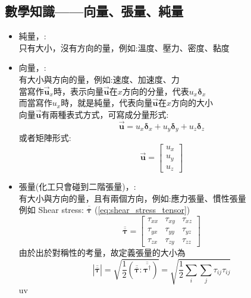 \documentclass[../main.tex]{subfiles}
\begin{document}
\subsection{數學知識——向量、張量、純量}
\begin{itemize}
  \item 純量，:\\
  只有大小，沒有方向的量，例如:溫度、壓力、密度、黏度
  \item 向量，:\\
  有大小與方向的量，例如:速度、加速度、力\\
  當寫作$\vec {\bm u}_x$時，表示向量$\vec {\bm u}$在$x$方向的分量，代表$u_x \bm \delta_x$\\
  而當寫作$u_x$時，就是純量，代表向量$\vec {\bm u}$在$x$方向的大小\\
  向量$\vec {\bm u}$有兩種表式方式，可寫成分量形式:
  \begin{equation}
    \vec {\bm u} = u_x \bm \delta_x + u_y \bm \delta_y + u_z \bm \delta_z
  \end{equation}
  或者矩陣形式:
  \begin{equation}
    \vec {\bm u} = \begin{bmatrix}
      u_x \\
      u_y \\
      u_z 
    \end{bmatrix}
  \end{equation}
  \item 張量(化工只會碰到二階張量)，:\\
  有大小與方向的量，且有兩個方向，例如:應力張量、慣性張量\\
  例如 Shear stress: $\overline{\overline{\bm \tau}}$ (\ref{eq:shear_stress_tensor})
  \begin{equation}
    \overline{\overline{\bm \tau}} = \begin{bmatrix}
      \tau_{xx} & \tau_{xy} & \tau_{xz} \\
      \tau_{yx} & \tau_{yy} & \tau_{yz} \\
      \tau_{zx} & \tau_{zy} & \tau_{zz}
    \end{bmatrix}
  \end{equation}
  由於出於對稱性的考量，故定義張量的大小為
  \begin{equation}
    \left|\overline{\overline {\bm \tau}}\right| = \sqrt{\frac{1}{2}\left(
      \overline{\overline {\bm \tau}} : \overline{\overline {\bm \tau^\dagger}}  
    \right)} = \sqrt{\frac{1}{2}\sum_{i}\sum_{j} \tau_{ij}\tau_{ij}}
  \end{equation}uv

\end{itemize}
\end{document}
